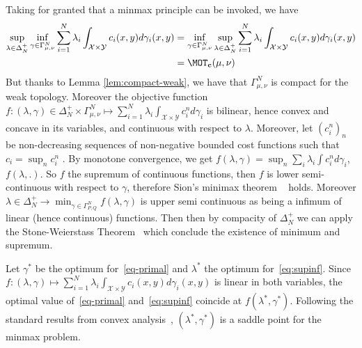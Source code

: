 \begin{prv*}
Taking for granted that a minmax principle can be invoked, we have
\begin{align*}
    \sup_{\lambda\in\Delta_N^{+}}\inf_{\gamma\in\Gamma_{\mu,\nu}^N} \sum_{i=1}^N\lambda_i\int_{\mathcal{X}\times\mathcal{Y}}c_i(x,y)d\gamma_i(x,y) &= \inf_{\gamma\in\Gamma_{\mu,\nu}^N}\sup_{\lambda\in \Delta_N^{+}} \sum_{i=1}^N\lambda_i\int_{\mathcal{X}\times\mathcal{Y}}c_i(x,y)d\gamma_i(x,y)\\
    &=\MOT_{\mathbf{c}}(\mu,\nu)
\end{align*}
But thanks to Lemma \ref{lem:compact-weak}, we have that $\Gamma_{\mu,\nu}^N$ is compact for the weak topology. Moreover the objective function $f:(\lambda,\gamma)\in\Delta_N^{+}\times\Gamma^N_{\mu,\nu} \mapsto \sum_{i=1}^N\lambda_i \int_{\mathcal{X}\times \mathcal{Y}} c^n_id\gamma_i$ is bilinear, hence convex and concave  in its variables, and continuous with respect to $\lambda$. Moreover, let $(c^n_i)_n$ be non-decreasing sequences of non-negative bounded cost functions such that $c_i=\sup_n c^n_i$ . By monotone convergence, we get $f(\lambda,\gamma) = \sup_n \sum_i\lambda_i \int c^n_i d\gamma_i$, $f(\lambda,.)$. So $f$ the supremum of continuous functions, then $f$ is lower semi-continuous with respect to $\gamma$, therefore Sion's minimax theorem
~\citep{sion1958} holds.
Moreover $\lambda\in\Delta_N^{+} \rightarrow \min_{\gamma\in\Gamma_{P,Q}^N} f(\lambda,\gamma)$ is upper semi continuous as being a infimum of linear (hence continuous) functions. Then then by compacity of $\Delta_N^{+}$ we can apply the Stone-Weierstass Theorem~\citep[Theorem 5.8]{rudin1991functional} which conclude the existence of minimum and supremum.

Let $\gamma^*$ be the optimum for~\eqref{eq-primal} and $\lambda^*$ the optimum for~\eqref{eq:supinf}. Since $f:(\lambda,\gamma)\mapsto\sum_{i=1}^N\lambda_i\int_{\mathcal{X}\times\mathcal{Y}}c_i(x,y)d\gamma_i(x,y)$ is linear in both variables, the optimal value of~\eqref{eq-primal} and~\eqref{eq:supinf} coincide at $f(\lambda^*,\gamma^*)$. Following the standard results from convex analysis~\citep[Lemma 36.2, Corollary  37.6.2]{rockafellar1970convex}, $(\lambda^*,\gamma^*)$ is a saddle point for the minmax problem.
\end{prv*}

